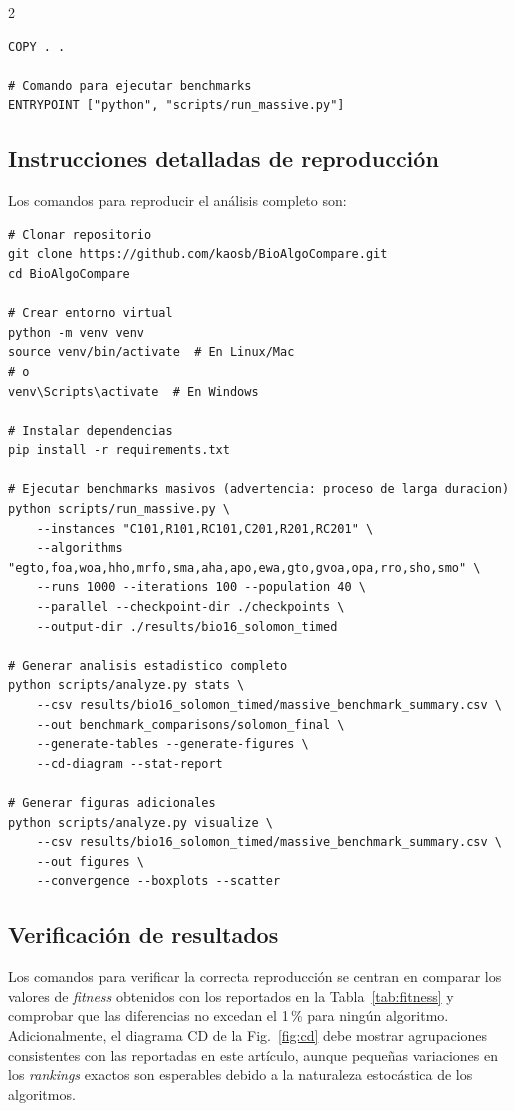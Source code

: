 \documentclass[10pt,a4paper]{extarticle}
\begin{document}
{\begin{multicols}{2}
\begin{lstlisting}
COPY . .

# Comando para ejecutar benchmarks
ENTRYPOINT ["python", "scripts/run_massive.py"]
\end{lstlisting}

\subsection{Instrucciones detalladas de reproducción}
Los comandos para reproducir el análisis completo son:
\begin{lstlisting}
# Clonar repositorio
git clone https://github.com/kaosb/BioAlgoCompare.git
cd BioAlgoCompare

# Crear entorno virtual
python -m venv venv
source venv/bin/activate  # En Linux/Mac
# o
venv\Scripts\activate  # En Windows

# Instalar dependencias
pip install -r requirements.txt

# Ejecutar benchmarks masivos (advertencia: proceso de larga duracion)
python scripts/run_massive.py \
    --instances "C101,R101,RC101,C201,R201,RC201" \
    --algorithms "egto,foa,woa,hho,mrfo,sma,aha,apo,ewa,gto,gvoa,opa,rro,sho,smo" \
    --runs 1000 --iterations 100 --population 40 \
    --parallel --checkpoint-dir ./checkpoints \
    --output-dir ./results/bio16_solomon_timed

# Generar analisis estadistico completo
python scripts/analyze.py stats \
    --csv results/bio16_solomon_timed/massive_benchmark_summary.csv \
    --out benchmark_comparisons/solomon_final \
    --generate-tables --generate-figures \
    --cd-diagram --stat-report

# Generar figuras adicionales
python scripts/analyze.py visualize \
    --csv results/bio16_solomon_timed/massive_benchmark_summary.csv \
    --out figures \
    --convergence --boxplots --scatter
\end{lstlisting}

\subsection{Verificación de resultados}
Los comandos para verificar la correcta reproducción se centran en comparar los valores de \textit{fitness} obtenidos con los reportados en la Tabla~\ref{tab:fitness} y comprobar que las diferencias no excedan el 1\,\% para ningún algoritmo. Adicionalmente, el diagrama CD de la Fig.~\ref{fig:cd} debe mostrar agrupaciones consistentes con las reportadas en este artículo, aunque pequeñas variaciones en los \textit{rankings} exactos son esperables debido a la naturaleza estocástica de los algoritmos.
\end{multicols}

}
\end{document}
